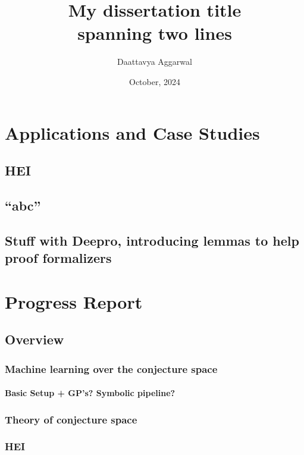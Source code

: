 \documentclass[firstyr, withindex, glossary]{cam-thesis}
\title{My dissertation title\\
spanning two lines}
\author{Daattavya Aggarwal}
\date{October, 2024}
\theoremstyle{definition}
\theoremstyle{remark}
\begin{document}
\frontmatter{}






\chapter{Applications and Case Studies}
\section{HEI}
\section{``abc''}
\section{Stuff with Deepro, introducing lemmas to help proof formalizers}

\chapter{Progress Report}
\section{Overview}
\subsection{Machine learning over the conjecture space}
\subsubsection{Basic Setup + GP's? Symbolic pipeline?}
\subsection{Theory of conjecture space}
\subsection{HEI}
\end{document}
